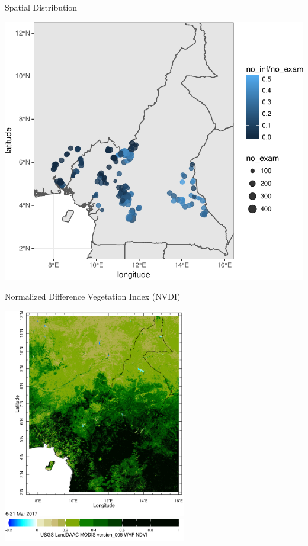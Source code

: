 \documentclass[11pt,ignorenonframetext,]{beamer}
\begin{document}
\begin{frame}{Spatial Distribution}

\includegraphics{Lec21_files/figure-beamer/unnamed-chunk-2-1.pdf}

\end{frame}

\begin{frame}[t]{Normalized Difference Vegetation Index (NVDI)}

\vspace{-2.5mm}

\begin{center}
\includegraphics[width=0.6\textwidth]{figs/ndvi_cameroon.pdf} \\
\includegraphics[width=0.6\textwidth]{figs/ndvi_cameroon_scale.pdf}
\end{center}

\end{frame}
\end{document}
